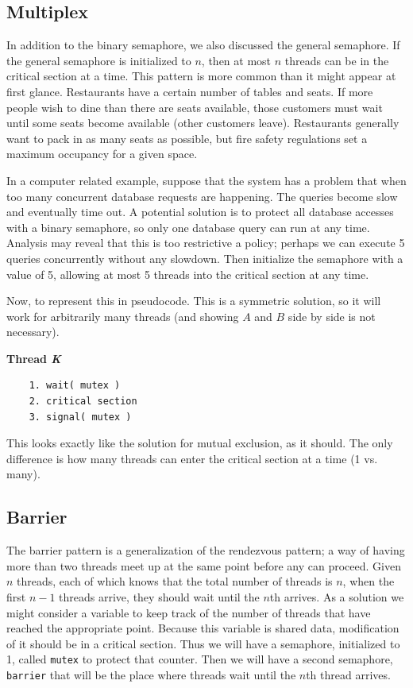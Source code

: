 \subsection*{Multiplex}
In addition to the binary semaphore, we also discussed the general semaphore. If the general semaphore is initialized to $n$, then at most $n$ threads can be in the critical section at a time. This pattern is more common than it might appear at first glance. Restaurants have a certain number of tables and seats. If more people wish to dine than there are seats available, those customers must wait until some seats become available (other customers leave). Restaurants generally want to pack in as many seats as possible, but fire safety regulations set a maximum occupancy for a given space.

In a computer related example, suppose that the system has a problem that when too many concurrent database requests are happening. The queries become slow and eventually time out. A potential solution is to protect all database accesses with a binary semaphore, so only one database query can run at any time. Analysis may reveal that this is too restrictive a policy; perhaps we can execute 5 queries concurrently without any slowdown. Then initialize the semaphore with a value of 5, allowing at most 5 threads into the critical section at any time.

Now, to represent this in pseudocode. This is a symmetric solution, so it will work for arbitrarily many threads (and showing $A$ and $B$ side by side is not necessary).

\textbf{Thread \textit{K}}\vspace{-2em}
  \begin{verbatim}
	1. wait( mutex )
	2. critical section
	3. signal( mutex )
  \end{verbatim}
\vspace{-2em}

This looks exactly like the solution for mutual exclusion, as it should. The only difference is how many threads can enter the critical section at a time (1 vs. many). 


\subsection*{Barrier}
The barrier pattern is a generalization of the rendezvous pattern; a way of having more than two threads meet up at the same point before any can proceed. Given $n$ threads, each of which knows that the total number of threads is $n$, when the first $n-1$ threads arrive, they should wait until the $n$th arrives. As a solution we might consider a variable to keep track of the number of threads that have reached the appropriate point. Because this variable is shared data, modification of it should be in a critical section.  Thus we will have a semaphore, initialized to 1, called \texttt{mutex} to protect that counter. Then we will have a second semaphore, \texttt{barrier} that will be the place where threads wait until the $n$th thread arrives.


